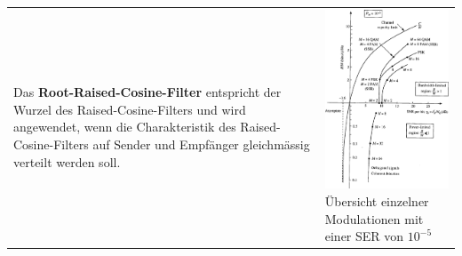 \begin{tabular}{ll}
{    Das \textbf{Root-Raised-Cosine-Filter} entspricht der Wurzel des
    Raised-Cosine-Filters und wird angewendet, wenn die Charakteristik 
    des Raised-Cosine-Filters auf Sender und Empfänger
    gleichmässig verteilt werden soll.
    } &\parbox{7cm}{
	\includegraphics[width=7cm]{./bilder/modulation_SER.png}\\
	Übersicht einzelner Modulationen mit einer SER von $10^{-5}$
	}
\end{tabular}
